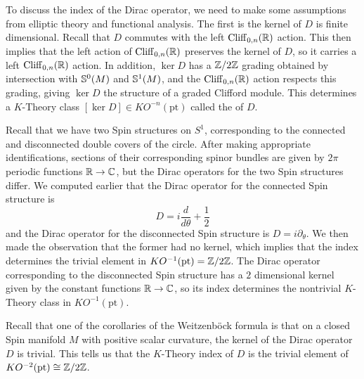%
To discuss the index of the Dirac operator, we need to make some assumptions from
elliptic theory and functional analysis. The first is the kernel of $D$ is finite
dimensional. Recall that $D$ commutes with the left $\Cliff_{0,n}(\R)$ action.
This then implies that the left action of $\Cliff_{0,n}(\R)$ preserves the kernel of
$D$, so it carries a left $\Cliff_{0,n}(\R)$ action. In addition, $\ker D$ has a
$\Z/2\Z$ grading obtained by intersection with $\S^0(M)$ and $\S^1(M)$, and the
$\Cliff_{0,n}(\R)$ action respects this grading, giving $\ker D$ the structure of a
graded Clifford module. This determines a $K$-Theory class
$[\ker D] \in KO^{-n}(\mathrm{pt})$ called the  of $D$.
%
\begin{exmp}
Recall that we have two Spin structures on $S^1$, corresponding to the connected
and disconnected double covers of the circle. After making appropriate identifications,
sections of their corresponding spinor bundles are given by $2\pi$ periodic functions
$\R \to \C$, but the Dirac operators for the two Spin structures differ. We computed
earlier that the Dirac operator for the connected Spin structure is
\[
D = i\frac{d}{d\theta} + \frac{1}{2}
\]
and the Dirac operator for the disconnected Spin structure is $D = i\partial_\theta$.
We then made the observation that the former had no kernel, which implies that
the index determines the trivial element in $KO^{-1}(\mathrm{pt}) = \Z/2\Z$.
The Dirac operator corresponding to the disconnected Spin structure has a
$2$ dimensional kernel given by the constant functions $\R \to \C$, so its
index determines the nontrivial $K$-Theory class in $KO^{-1}(\mathrm{pt})$.
\end{exmp}
%
\begin{exmp}
Recall that one of the corollaries of the Weitzenb\"ock formula is that on a closed
Spin manifold $M$ with positive scalar curvature, the kernel of the Dirac operator $D$
is trivial. This tells us that the $K$-Theory index of $D$ is the trivial element of
$KO^{-2}(\mathrm{pt}) \cong \Z/2\Z$.
\end{exmp}
%
